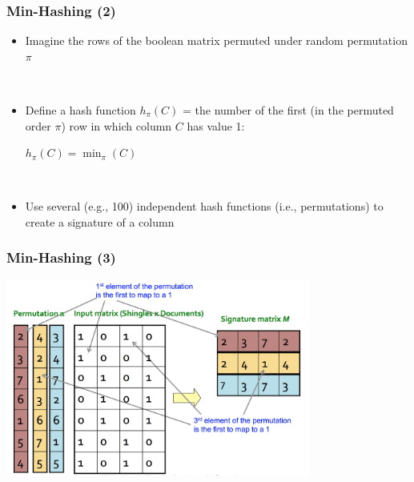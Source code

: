 \documentclass[svgnames]{beamer}
\begin{document}
  
\begin{frame} \frametitle{Min-Hashing (2)}

\begin{itemize}
\item Imagine the rows of the boolean matrix permuted under random permutation $\pi$

~\\

\item Define a hash function $h_\pi(C)$ = the number of the first (in the permuted order $\pi$) row in which column $C$ has value 1:
  
  \begin{center}
  $h_\pi (C) = \min_\pi(C)$
  \end{center}

~\\

\item Use several (e.g., 100) independent hash functions (i.e., permutations) to create a signature of a column
\end{itemize}
\end{frame}

  
\begin{frame} \frametitle{Min-Hashing (3)}
\includegraphics[width=10cm]{minhash}
\end{frame}

  
\end{document}

